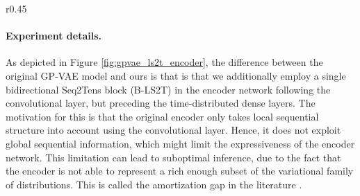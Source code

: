 \documentclass{article} \usepackage{iclr2021_conference,times}
\theoremstyle{plain}
\theoremstyle{definition}
\begin{document}
\begin{wrapfigure}{r}{0.45\textwidth}
		\endpgfgraphicnamed
\vspace{-5pt}
	\caption{Encoder in GP-VAE (B-LS2T).}
	\label{fig:gpvae_ls2t_encoder}
	\vspace{-10pt}
	\end{wrapfigure}

\paragraph{Experiment details.} As depicted in Figure \ref{fig:gpvae_ls2t_encoder}, the difference between the original GP-VAE model and ours is that is that we additionally employ a single bidirectional Seq2Tens block (B-LS2T) in the encoder network following the convolutional layer, but preceding the time-distributed dense layers. The motivation for this is that the original encoder only takes local sequential structure into account using the convolutional layer. Hence, it does not exploit global sequential information, which might limit the expressiveness of the encoder network. This limitation can lead to suboptimal inference, due to the fact that the encoder is not able to represent a rich enough subset of the variational family of distributions. This is called the amortization gap in the literature \citep{Cremer2018inference}.
\end{document}
